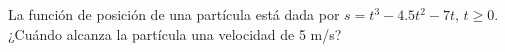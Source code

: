 \setcounter{enumi}{6}
\item La función de posición de una partícula está dada por $s = t^3 - 4.5t^2 - 7t$, $t \ge 0$. ¿Cuándo alcanza la partícula una velocidad de 5 m/s?
